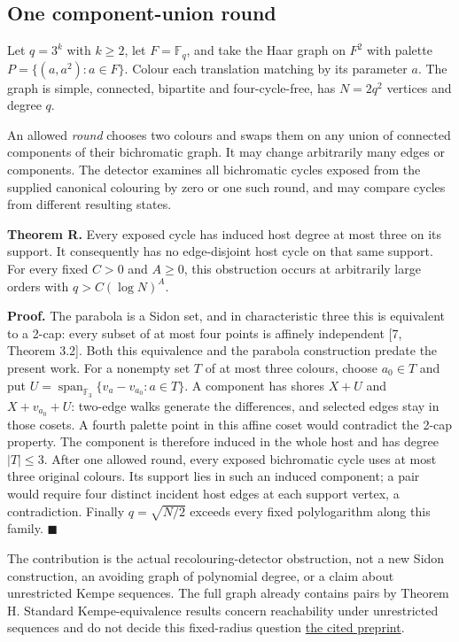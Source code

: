 \documentclass[smallextended]{svjour3}
\newcounter{none} %
\begin{document}
\subsection{One component-union
round}\label{one-component-union-round}

Let \(q=3^k\) with \(k\geq2\), let \(F=\mathbb F_q\), and take the Haar
graph on \(F^2\) with palette \(P=\{(a,a^2):a\in F\}\). Colour each
translation matching by its parameter \(a\). The graph is simple,
connected, bipartite and four-cycle-free, has \(N=2q^2\) vertices and
degree \(q\).

An allowed \emph{round} chooses two colours and swaps them on any union
of connected components of their bichromatic graph. It may change
arbitrarily many edges or components. The detector examines all
bichromatic cycles exposed from the supplied canonical colouring by zero
or one such round, and may compare cycles from different resulting
states.

\textbf{Theorem R.} Every exposed cycle has induced host degree at most
three on its support. It consequently has no edge-disjoint host cycle on
that same support. For every fixed \(C>0\) and \(A\geq0\), this
obstruction occurs at arbitrarily large orders with \(q>C(\log N)^A\).

\textbf{Proof.} The parabola is a Sidon set, and in characteristic three
this is equivalent to a 2-cap: every subset of at most four points is
affinely independent {[}7, Theorem 3.2{]}. Both this equivalence and the
parabola construction predate the present work. For a nonempty set \(T\)
of at most three colours, choose \(a_0\in T\) and put
\(U=\operatorname{span}_{\mathbb F_3}\{v_a-v_{a_0}:a\in T\}\). A
component has shores \(X+U\) and \(X+v_{a_0}+U\): two-edge walks
generate the differences, and selected edges stay in those cosets. A
fourth palette point in this affine coset would contradict the 2-cap
property. The component is therefore induced in the whole host and has
degree \(|T|\leq3\). After one allowed round, every exposed bichromatic
cycle uses at most three original colours. Its support lies in such an
induced component; a pair would require four distinct incident host
edges at each support vertex, a contradiction. Finally \(q=\sqrt{N/2}\)
exceeds every fixed polylogarithm along this family. $\blacksquare$

The contribution is the actual recolouring-detector obstruction, not a
new Sidon construction, an avoiding graph of polynomial degree, or a
claim about unrestricted Kempe sequences. The full graph already
contains pairs by Theorem H. Standard Kempe-equivalence results concern
reachability under unrestricted sequences and do not decide this
fixed-radius question \href{https://arxiv.org/abs/2105.01363}{the cited
preprint}.
\end{document}
